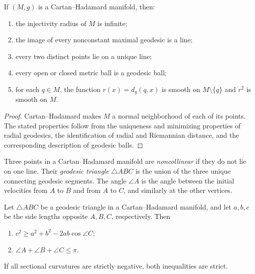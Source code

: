\begin{proposition}
\label{prop:basic-properties-cartan-hadamard}

If $(M,g)$ is a Cartan--Hadamard manifold, then:
\begin{enumerate}[label=(\alph*)]
\item the injectivity radius of $M$ is infinite;
\item the image of every nonconstant maximal geodesic is a line;
\item every two distinct points lie on a unique line;
\item every open or closed metric ball is a geodesic ball;
\item for each $q\in M$, the function $r(x)=d_g(q,x)$ is smooth on
$M\setminus\{q\}$ and $r^2$ is smooth on $M$.
\end{enumerate}
\begin{proof}
\sketch Cartan--Hadamard makes $M$ a normal neighborhood of each of its
points.  The stated properties follow from the uniqueness and minimizing
properties of radial geodesics, the identification of radial and Riemannian
distance, and the corresponding description of geodesic balls.
\end{proof}
\end{proposition}

Three points in a Cartan--Hadamard manifold are \emph{noncollinear} if they do
not lie on one line.  Their \emph{geodesic triangle} $\triangle ABC$ is the
union of the three unique connecting geodesic segments.  The angle $\angle A$
is the angle between the initial velocities from $A$ to $B$ and from $A$ to
$C$, and similarly at the other vertices.

\begin{proposition}
\label{prop:geodesic-triangle-inequalities}
Let $\triangle ABC$ be a geodesic triangle in a Cartan--Hadamard manifold,
and let $a,b,c$ be the side lengths opposite $A,B,C$, respectively.  Then
\begin{enumerate}
\item[(a)] $c^2\geq a^2+b^2-2ab\cos\angle C$;
\item[(b)] $\angle A+\angle B+\angle C\leq\pi$.
\end{enumerate}
If all sectional curvatures are strictly negative, both inequalities are
strict.
\end{proposition}

